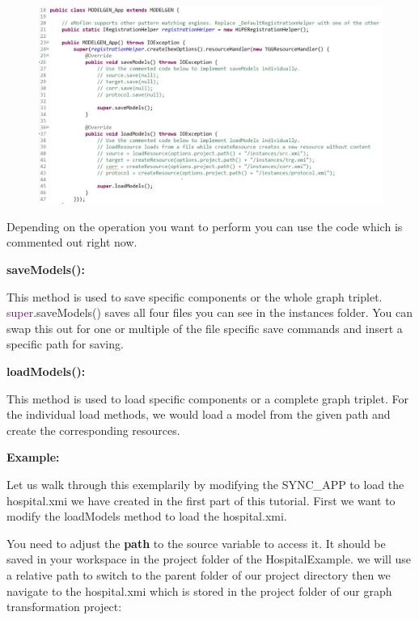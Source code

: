 {\begin{figure}[h]
    \centering
    \includegraphics[scale=0.65 ]{pictures/application_MODELGEN.png}
    \caption{}
    \label{setDefaultNumber}
\end{figure}

Depending on the operation you want to perform you can use the code which is commented out right now.\newline

\textbf{saveModels():}

This method is used to save specific components or the whole graph triplet. \textcolor{Purple}{super}.saveModels() saves all four files you can see in the instances folder. You can swap this out for one or multiple of the file specific save commands and insert a specific path for saving.\newline

\textbf{loadModels():}

This method is used to load specific components or a complete graph triplet.
For the individual load methods, we would load a model from the given path and create the corresponding resources.\newline

\textbf{Example:}

Let us walk through this exemplarily by modifying the \textsf{SYNC\_APP} to load the \textsf{hospital.xmi} we have created in the first part of this tutorial. First we want to modify the \textsf{loadModels} method to load the \textsf{hospital.xmi}.

You need to adjust the \textbf{path} to the source variable to access it. It should be saved in your workspace in the project folder of the \textsf{HospitalExample}. we will use a relative path to switch to the parent folder of our project directory then we navigate to the \textsf{hospital.xmi} which is stored in the project folder of our graph transformation project:\newline

}
